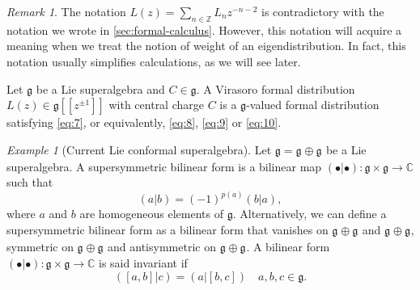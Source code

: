 \documentclass[a4paper, 12pt, reqno]{amsart}
\theoremstyle{remark}
\newtheorem{remark}[theorem]{Remark}
\newtheorem{example}[theorem]{Example}
\numberwithin{equation}{subsection}
\DeclareMathOperator{\zero}{\overline{0}}
\DeclareMathOperator{\one}{\overline{1}}
\begin{document}
\begin{remark}
  \label{rmk:6}
  The notation $L(z) = \sum_{n \in \mathbb{Z}}L_nz^{-n - 2}$ is contradictory with the notation we wrote in \cref{sec:formal-calculus}.
  However, this notation will acquire a meaning when we treat the notion of weight of an eigendistribution.
  In fact, this notation usually simplifies calculations, as we will see later.
\end{remark}

Let $\mathfrak{g}$ be a Lie superalgebra and $C \in \mathfrak{g}$.
A Virasoro formal distribution $L(z) \in \mathfrak{g}[[z^{\pm 1}]]$ with central charge $C$ is a $\mathfrak{g}$-valued formal distribution satisfying \eqref{eq:7}, or equivalently, \eqref{eq:8}, \eqref{eq:9} or \eqref{eq:10}.

\begin{example}[Current Lie conformal superalgebra]
  \label{exa:2}
  Let $\mathfrak{g} = \mathfrak{g}_{\zero} \oplus \mathfrak{g}_{\one}$ be a Lie superalgebra.
  A supersymmetric bilinear form is a bilinear map $(\bullet| \bullet): \mathfrak{g} \times \mathfrak{g} \to \mathbb{C}$ such that
  \begin{equation*}
    (a| b) = (-1)^{p(a)}(b| a),
  \end{equation*}
  where $a$ and $b$ are homogeneous elements of $\mathfrak{g}$.
  Alternatively, we can define a supersymmetric bilinear form as a bilinear form that vanishes on $\mathfrak{g}_{\zero} \oplus \mathfrak{g}_{\one}$ and $\mathfrak{g}_{\one} \oplus \mathfrak{g}_{\zero}$, symmetric on $\mathfrak{g}_{\zero} \oplus \mathfrak{g}_{\zero}$ and antisymmetric on $\mathfrak{g}_{\one} \oplus \mathfrak{g}_{\one}$.
  A bilinear form $(\bullet| \bullet): \mathfrak{g} \times \mathfrak{g} \to \mathbb{C}$ is said invariant if
  \begin{equation*}
    ([a, b]| c)=(a| [b, c])\quad a, b, c \in \mathfrak{g}.
  \end{equation*}


\end{example}
\end{document}
